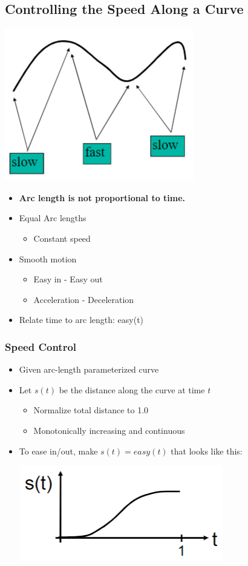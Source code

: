 \documentclass{article}
\begin{document}
\subsection*{Controlling the Speed Along a Curve}
\begin{center}
    \includegraphics*[scale=0.8]{W4_5.png}
\end{center}
\begin{itemize}
    \item \textbf{Arc length is not proportional to time.}
    \item Equal Arc lengths
    \begin{itemize}
        \item Constant speed
    \end{itemize}
    \item Smooth motion
    \begin{itemize}
        \item Easy in - Easy out
        \item Acceleration - Deceleration
    \end{itemize}
    \item Relate time to arc length: easy(t)
\end{itemize}
\subsubsection*{Speed Control}
\begin{itemize}
    \item Given arc-length parameterized curve
    \item Let $s(t)$ be the distance along the curve at time $t$
    \begin{itemize}
        \item Normalize total distance to 1.0
        \item Monotonically increasing and continuous
    \end{itemize}
    \item To ease in/out, make $s(t) = easy(t)$ that looks like this:
    \begin{center}
        \includegraphics*[scale=0.7]{W4_6.png}
    \end{center}
\end{itemize}
\end{document}
